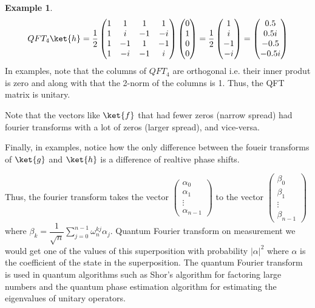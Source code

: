\documentclass[12pt, oneside]{book}
\theoremstyle{definition}
\theoremstyle{definition}
\newtheorem{example}{Example}[section]
\theoremstyle{remark}
\begin{document}
\begin{example}
    \[ QFT_4\ket{h}=\dfrac{1}{2}\begin{pmatrix} 1 & 1 & 1 & 1 \\ 1 & i & -1 & -i \\ 1 & -1 & 1 & -1 \\ 1 & -i & -1 & i \end{pmatrix}\begin{pmatrix} 0 \\ 1 \\ 0 \\ 0 \end{pmatrix}=\dfrac{1}{2}\begin{pmatrix} 1 \\ i \\ -1 \\ -i \end{pmatrix}=\begin{pmatrix} 0.5 \\ 0.5i \\ -0.5 \\ -0.5i \end{pmatrix} \]
    In examples, note that the columns of $QFT_4$ are orthogonal i.e. their inner produt is zero and along with that 
    the 2-norm of the columns is 1. Thus, the QFT matrix is unitary.

    Note that the vectors like $\ket{f}$ that had fewer zeros (narrow spread) had fourier transforms with a lot of zeros (larger spread),
    and vice-versa.

    Finally, in examples, notice how the only difference between the foueir transforms of $\ket{g}$ and $\ket{h}$ is a difference of realtive phase shifts.
\end{example}
Thus, the fourier transform takes the vector $\begin{pmatrix} \alpha_0 \\ \alpha_1 \\ \vdots \\ \alpha_{n-1} \end{pmatrix}$ to the vector $\begin{pmatrix} \beta_0 \\ \beta_1 \\ \vdots \\ \beta_{n-1} \end{pmatrix}$ where $\beta_k=\dfrac{1}{\sqrt{n}}\sum_{j=0}^{n-1}\omega_n^{kj}\alpha_j$.
Quantum Fourier transform on measurement we would get one of the values of this superposition with probability $|\alpha|^2$ where $\alpha$ is the coefficient of the state in the superposition. The quantum Fourier transform is used in quantum algorithms such as Shor's algorithm for factoring large numbers and the quantum phase estimation algorithm for estimating the eigenvalues of unitary operators.\\
\end{document}
